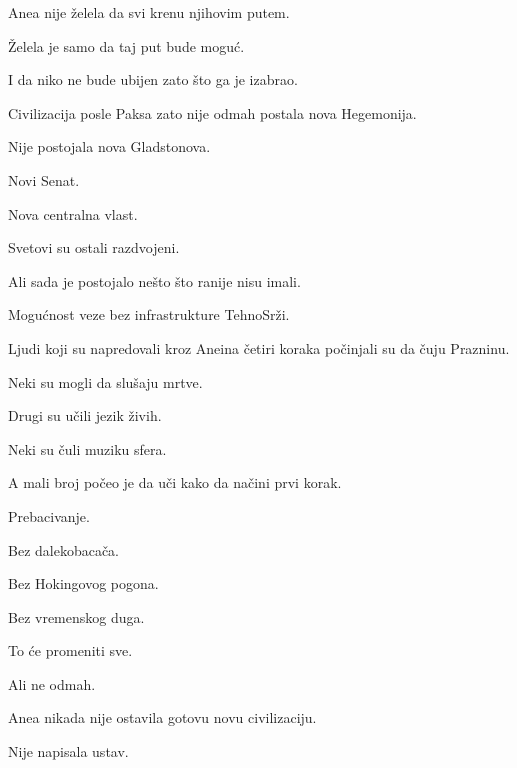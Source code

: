 Anea nije želela da svi krenu njihovim putem.

\bigskip

Želela je samo da taj put bude moguć.

\bigskip

I da niko ne bude ubijen zato što ga je izabrao.

\bigskip

Civilizacija posle Paksa zato nije odmah postala nova Hegemonija.

\bigskip

Nije postojala nova Gladstonova.

Novi Senat.

Nova centralna vlast.

\bigskip

Svetovi su ostali razdvojeni.

\bigskip

Ali sada je postojalo nešto što ranije nisu imali.

\bigskip

Mogućnost veze bez infrastrukture TehnoSrži.

\bigskip

Ljudi koji su napredovali kroz Aneina četiri koraka počinjali su da čuju Prazninu.

\bigskip

Neki su mogli da slušaju mrtve.

\bigskip

Drugi su učili jezik živih.

\bigskip

Neki su čuli muziku sfera.

\bigskip

A mali broj počeo je da uči kako da načini prvi korak.

\bigskip

Prebacivanje.

\bigskip

Bez dalekobacača.

Bez Hokingovog pogona.

Bez vremenskog duga.

\bigskip

To će promeniti sve.

\bigskip

Ali ne odmah.

\bigskip

Anea nikada nije ostavila gotovu novu civilizaciju.

\bigskip

Nije napisala ustav.

